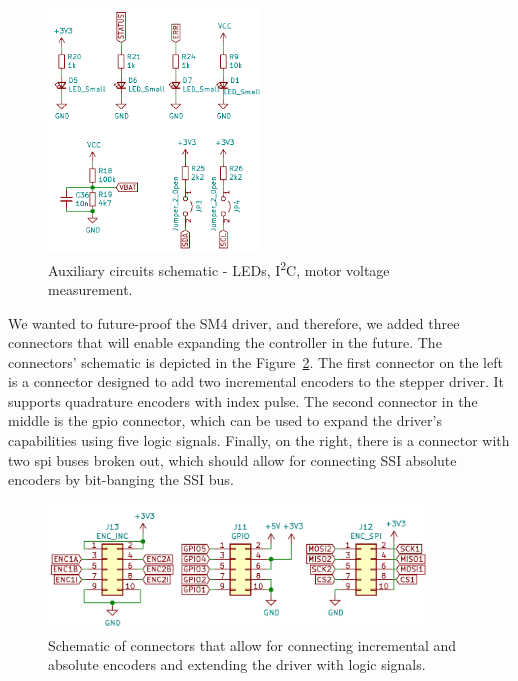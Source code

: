 \begin{figure}[H]
    \centering
    \includegraphics[width=0.5\textwidth]{obrazky/schem_aux}
    \caption{Auxiliary circuits schematic - LEDs, I\textsuperscript{2}C, motor voltage measurement.}
    \label{fig:schem_aux}
\end{figure}

We wanted to future-proof the SM4 driver, and therefore, we added three connectors that will enable expanding the controller in the future.
The connectors' schematic is depicted in the Figure~\ref{fig:schem_enc_gpio}.
The first connector on the left is a connector designed to add two incremental encoders to the stepper driver.
It supports quadrature encoders with index pulse.
The second connector in the middle is the \acs{gpio} connector, which can be used to expand the driver's capabilities using five logic signals.
Finally, on the right, there is a connector with two \acs{spi} buses broken out, which should allow for connecting SSI absolute encoders by bit-banging the SSI bus.

\begin{figure}[H]
    \centering
    \includegraphics[width=0.9\textwidth]{obrazky/schem_enc_gpio}
    \caption{Schematic of connectors that allow for connecting incremental and absolute encoders and extending the driver with logic signals.}
    \label{fig:schem_enc_gpio}
\end{figure}

